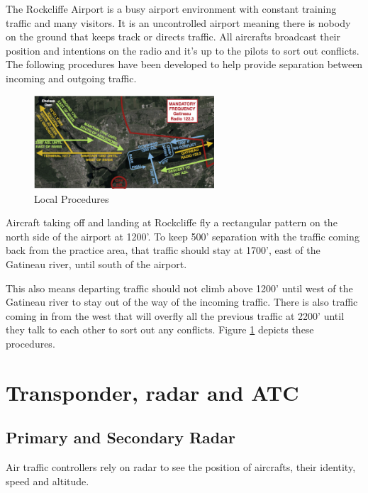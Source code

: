 \documentclass[12pt,letterpaper]{article}
\begin{document}
        The Rockcliffe Airport is a busy airport environment with constant training traffic and many visitors. It is an uncontrolled airport meaning there is nobody on the ground that keeps track or directs traffic. All aircrafts broadcast their position and intentions on the radio and it's up to the pilots to sort out conflicts. The following procedures have been developed to help provide separation between incoming and outgoing traffic.
        
        \begin{figure}
          \begin{center}
            \includegraphics[width=0.6\textwidth]{cyro-local.png}
          \end{center}
          \caption{Local Procedures}
          \label{fig:local-procedures}
        \end{figure}

        Aircraft taking off and landing at Rockcliffe fly a rectangular pattern on the north side of the airport at 1200'. To keep 500' separation with the traffic coming back from the practice area, that traffic should stay at 1700', east of the Gatineau river, until south of the airport.
        
        This also means departing traffic should not climb above 1200' until west of the Gatineau river to stay out of the way of the incoming traffic. There is also traffic coming in from the west that will overfly all the previous traffic at 2200' until they talk to each other to sort out any conflicts. Figure \ref{fig:local-procedures} depicts these procedures.
        
        
    \section{Transponder, radar and ATC}
        \subsection{Primary and Secondary Radar}
        Air traffic controllers rely on radar to see the position of aircrafts, their identity, speed and altitude.
        
\end{document}
